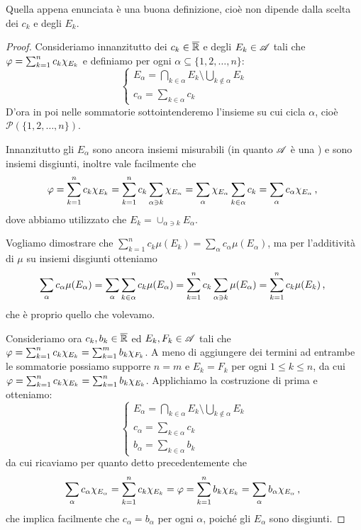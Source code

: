 \begin{remark}\label{nota:BuonaDefIntSemp}
	Quella appena enunciata è una buona definizione, cioè non dipende dalla scelta dei $c_k$ e degli $E_k$.
\end{remark}
\begin{proof}
	Consideriamo innanzitutto dei $c_k\in \overline{\mathbb R}$ e degli $E_k\in \mathscr A$ tali che $\varphi=\sum_{k=1}^nc_k\chi_{E_k}$ e definiamo per ogni $\alpha\subseteq\{1,2,\dots,n\}$:
	\begin{equation*}
		\begin{cases}
			E_\alpha=\bigcap_{k\in\alpha}E_k\setminus \bigcup_{k\not\in \alpha} E_k\\
			c_\alpha=\sum_{k\in\alpha} c_k
		\end{cases}
	\end{equation*}
	D'ora in poi nelle sommatorie sottointenderemo l'insieme su cui cicla $\alpha$, cioè $\mathcal{P}(\{1,2,\dots,n\})$.
	
	Innanzitutto gli $E_\alpha$ sono ancora insiemi misurabili (in quanto $\mathscr A$ è una \sigalg{}) e sono insiemi disgiunti, inoltre vale facilmente che
	\begin{equation*}
		\varphi=\sum_{k=1}^nc_k\chi_{E_k}=\sum_{k=1}^nc_k\sum_{\alpha\ni k}\chi_{E_\alpha}=\sum_\alpha \chi_{E_\alpha}\sum_{k\in\alpha}c_k=\sum_\alpha c_\alpha\chi_{E_\alpha}\, \text{, }
	\end{equation*}
	dove abbiamo utilizzato che $E_k=\cup_{\alpha\ni k} E_\alpha$.

	Vogliamo dimostrare che $\sum_{k=1}^nc_k\mu(E_k)=\sum_{\alpha}c_\alpha\mu(E_\alpha)$, ma per l'additività di $\mu$ su insiemi disgiunti otteniamo
	\begin{equation}\label{eq:RaffinamentoIntegrale}
		\sum_\alpha c_\alpha\mu(E_\alpha)=\sum_\alpha \sum_{k\in\alpha}c_k\mu(E_\alpha)=\sum_{k=1}^n c_k\sum_{\alpha \ni k} \mu(E_\alpha)=\sum_{k=1}^n c_k \mu(E_k)\, \text{, }
	\end{equation}
	che è proprio quello che volevamo.
	
	Consideriamo ora $c_k, b_k\in\overline{\mathbb R}$ ed $E_k,F_k\in\mathscr A$ tali che $\varphi=\sum_{k=1}^nc_k\chi_{E_k}=\sum_{k=1}^mb_k\chi_{F_k}$. A meno di aggiungere dei termini ad entrambe le sommatorie possiamo supporre $n=m$ e $E_k=F_k$ per ogni $1\le k\le n$, da cui $\varphi=\sum_{k=1}^nc_k\chi_{E_k}=\sum_{k=1}^nb_k\chi_{E_k}$. Applichiamo la costruzione di prima e otteniamo:
	\begin{equation*}
		\begin{cases}
			E_\alpha=\bigcap_{k\in\alpha}E_k\setminus \bigcup_{k\not\in \alpha} E_k\\
			c_\alpha=\sum_{k\in\alpha} c_k\\
			b_\alpha=\sum_{k\in\alpha} b_k
		\end{cases}
	\end{equation*}
	da cui ricaviamo per quanto detto precedentemente che
	\begin{equation}
		\sum_\alpha c_\alpha\chi_{E_\alpha}=\sum_{k=1}^nc_k\chi_{E_k}=\varphi=\sum_{k=1}^nb_k\chi_{E_k}=\sum_\alpha b_\alpha\chi_{E_\alpha}\, \text{, }
	\end{equation}
	che implica facilmente che $c_\alpha=b_\alpha$ per ogni $\alpha$, poiché gli $E_\alpha$ sono disgiunti.
	

\end{proof}
